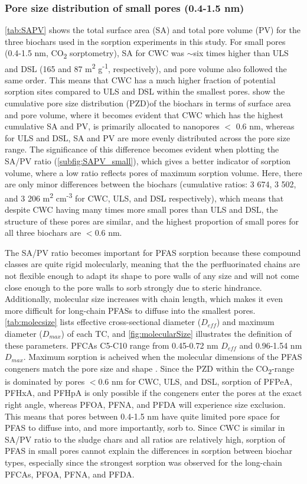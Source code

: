 \subsubsection{Pore size distribution of small pores (0.4-1.5 nm)}
\cref{tab:SAPV} shows the total surface area (SA) and total pore volume (PV) for the three biochars used in the sorption experiments in this study. For small pores (0.4-1.5 nm, CO\textsubscript{2} sorptometry), SA for CWC was $\sim$six times higher than ULS and DSL (165 and 87  m\textsuperscript{2} g\textsuperscript{-1}, respectively), and pore volume also followed the same order. This means that CWC has a much higher fraction of potential sorption sites compared to ULS and DSL within the smallest pores.  show the cumulative pore size distribution (PZD)of the biochars in terms of surface area and pore volume, where it becomes evident that CWC which has the highest cumulative SA and PV, is primarily allocated to nanopores $<$ 0.6 nm, whereas for ULS and DSL, SA and PV are more evenly distributed across the pore size range. The significance of this difference becomes evident when plotting the SA/PV ratio (\cref{subfig:SAPV_small}), which gives a better indicator of sorption volume, where a low ratio reflects pores of maximum sorption volume. Here, there are only minor differences between the biochars (cumulative ratios: 3 674, 3 502, and 3 206 m\textsuperscript{2} cm\textsuperscript{-3} for CWC, ULS, and DSL respectively), which means that despite CWC having many times more small pores than ULS and DSL, the structure of these pores are similar, and the highest proportion of small pores for all three biochars are $<$0.6 nm. 

The SA/PV ratio becomes important for PFAS sorption because these compound classes are quite rigid molecularly, meaning that the the perfluorinated chains are not flexible enough to adapt its shape to pore walls of any size and will not come close enough to the pore walls to sorb strongly due to steric hindrance. Additionally, molecular size increases with chain length, which makes it even more difficult for long-chain PFASs to diffuse into the smallest pores. \cref{tab:molecsize} lists effective cross-sectional diameter ($D_{eff}$) and maximum diameter ($D_{max}$) of each TC, and \cref{fig:molecularSize} illustrates the definition of these parameters. PFCAs C5-C10 range from 0.45-0.72 nm $D_{eff}$ and 0.96-1.54 nm $D_{max}$. Maximum sorption is acheived when the molecular dimensions of the PFAS congeners match the pore size and shape \citep{Hale2016}. Since the PZD within the CO\textsubscript{2}-range is dominated by pores $<$0.6 nm for CWC, ULS, and DSL, sorption of PFPeA, PFHxA, and PFHpA is only possible if the congeners enter the pores at the exact right angle, whereas PFOA, PFNA, and PFDA will experience size exclusion. This means that pores between 0.4-1.5 nm have quite limited pore space for PFAS to diffuse into, and more importantly, sorb to. Since CWC is similar in SA/PV ratio to the sludge chars and all ratios are relatively high, sorption of PFAS in small pores cannot explain the differences in sorption between biochar types, especially since the strongest sorption was observed for the long-chain PFCAs, PFOA, PFNA, and PFDA.

